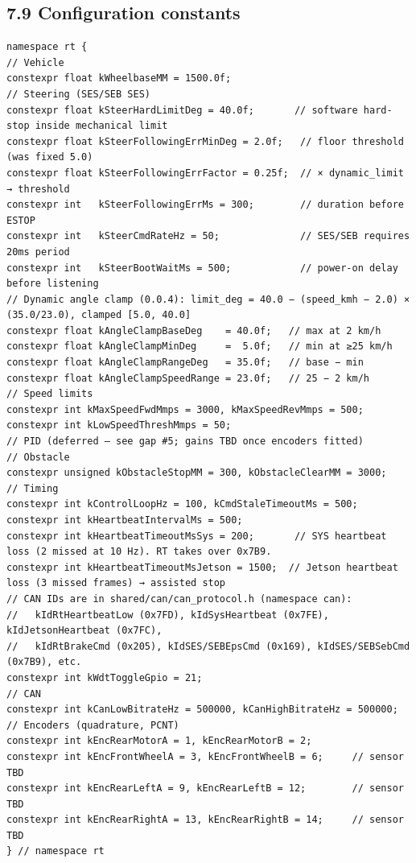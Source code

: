 \subsection{7.9 Configuration constants}\label{configuration-constants}

\begin{verbatim}
namespace rt {
// Vehicle
constexpr float kWheelbaseMM = 1500.0f;
// Steering (SES/SEB SES)
constexpr float kSteerHardLimitDeg = 40.0f;       // software hard-stop inside mechanical limit
constexpr float kSteerFollowingErrMinDeg = 2.0f;   // floor threshold (was fixed 5.0)
constexpr float kSteerFollowingErrFactor = 0.25f;  // × dynamic_limit → threshold
constexpr int   kSteerFollowingErrMs = 300;        // duration before ESTOP
constexpr int   kSteerCmdRateHz = 50;              // SES/SEB requires 20ms period
constexpr int   kSteerBootWaitMs = 500;            // power-on delay before listening
// Dynamic angle clamp (0.0.4): limit_deg = 40.0 − (speed_kmh − 2.0) × (35.0/23.0), clamped [5.0, 40.0]
constexpr float kAngleClampBaseDeg    = 40.0f;   // max at 2 km/h
constexpr float kAngleClampMinDeg     =  5.0f;   // min at ≥25 km/h
constexpr float kAngleClampRangeDeg   = 35.0f;   // base − min
constexpr float kAngleClampSpeedRange = 23.0f;   // 25 − 2 km/h
// Speed limits
constexpr int kMaxSpeedFwdMmps = 3000, kMaxSpeedRevMmps = 500;
constexpr int kLowSpeedThreshMmps = 50;
// PID (deferred — see gap #5; gains TBD once encoders fitted)
// Obstacle
constexpr unsigned kObstacleStopMM = 300, kObstacleClearMM = 3000;
// Timing
constexpr int kControlLoopHz = 100, kCmdStaleTimeoutMs = 500;
constexpr int kHeartbeatIntervalMs = 500;
constexpr int kHeartbeatTimeoutMsSys = 200;       // SYS heartbeat loss (2 missed at 10 Hz). RT takes over 0x7B9.
constexpr int kHeartbeatTimeoutMsJetson = 1500;  // Jetson heartbeat loss (3 missed frames) → assisted stop
// CAN IDs are in shared/can/can_protocol.h (namespace can):
//   kIdRtHeartbeatLow (0x7FD), kIdSysHeartbeat (0x7FE), kIdJetsonHeartbeat (0x7FC),
//   kIdRtBrakeCmd (0x205), kIdSES/SEBEpsCmd (0x169), kIdSES/SEBSebCmd (0x7B9), etc.
constexpr int kWdtToggleGpio = 21;
// CAN
constexpr int kCanLowBitrateHz = 500000, kCanHighBitrateHz = 500000;
// Encoders (quadrature, PCNT)
constexpr int kEncRearMotorA = 1, kEncRearMotorB = 2;
constexpr int kEncFrontWheelA = 3, kEncFrontWheelB = 6;     // sensor TBD
constexpr int kEncRearLeftA = 9, kEncRearLeftB = 12;        // sensor TBD
constexpr int kEncRearRightA = 13, kEncRearRightB = 14;     // sensor TBD
} // namespace rt
\end{verbatim}

